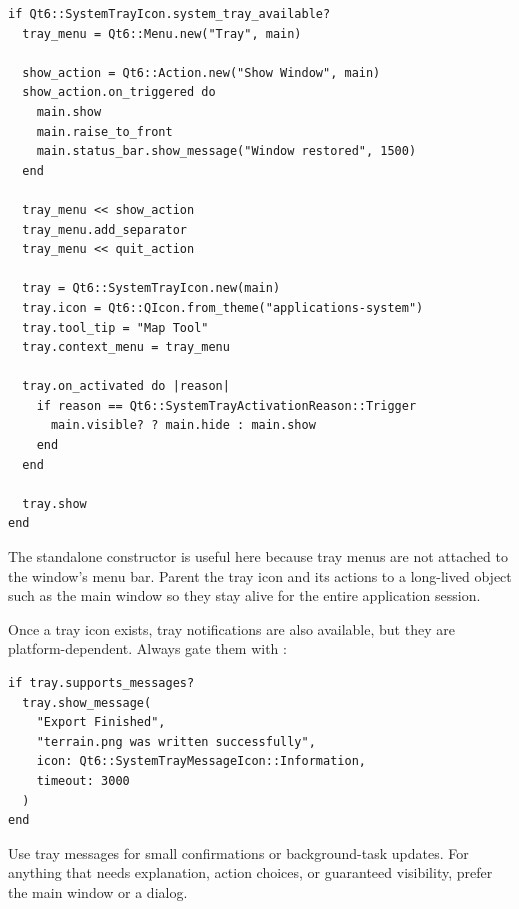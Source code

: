\begin{lstlisting}[style=crystal]
if Qt6::SystemTrayIcon.system_tray_available?
  tray_menu = Qt6::Menu.new("Tray", main)

  show_action = Qt6::Action.new("Show Window", main)
  show_action.on_triggered do
    main.show
    main.raise_to_front
    main.status_bar.show_message("Window restored", 1500)
  end

  tray_menu << show_action
  tray_menu.add_separator
  tray_menu << quit_action

  tray = Qt6::SystemTrayIcon.new(main)
  tray.icon = Qt6::QIcon.from_theme("applications-system")
  tray.tool_tip = "Map Tool"
  tray.context_menu = tray_menu

  tray.on_activated do |reason|
    if reason == Qt6::SystemTrayActivationReason::Trigger
      main.visible? ? main.hide : main.show
    end
  end

  tray.show
end
\end{lstlisting}

The standalone  constructor is useful here because tray menus are not attached to the window's menu bar. Parent the tray icon and its actions to a long-lived object such as the main window so they stay alive for the entire application session.

Once a tray icon exists, tray notifications are also available, but they are platform-dependent. Always gate them with :

\begin{lstlisting}[style=crystal]
if tray.supports_messages?
  tray.show_message(
    "Export Finished",
    "terrain.png was written successfully",
    icon: Qt6::SystemTrayMessageIcon::Information,
    timeout: 3000
  )
end
\end{lstlisting}

Use tray messages for small confirmations or background-task updates. For anything that needs explanation, action choices, or guaranteed visibility, prefer the main window or a dialog.

